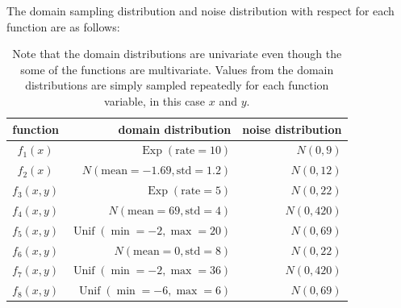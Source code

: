 \documentclass[12pt]{article}
\begin{document}
        The domain sampling distribution and noise distribution with respect for each function are as follows:
        \begin{table}[H]
            \centering
            \caption{Note that the domain distributions are univariate even though the some of the functions are multivariate. Values from the domain distributions are simply sampled repeatedly for each function variable, in this case $x$ and $y$.}
            \begin{tabular}{crr}
                \toprule
                function & domain distribution & noise distribution \\ 
                \midrule
                $f_1(x)$ & $\operatorname{Exp}(\text{rate}=10)$    & $N(0,9)$  \\
                $f_2(x)$ & $N(\text{mean}=-1.69, \text{std}=1.2)$    & $N(0,12)$  \\
                $f_3(x,y)$ & $\operatorname{Exp}(\text{rate}=5)$    & $N(0,22)$  \\
                $f_4(x,y)$ & $N(\text{mean}=69, \text{std}=4)$      & $N(0,420)$ \\
                $f_5(x,y)$ & $\operatorname{Unif}(\min=-2,\max=20)$ & $N(0,69)$  \\ 
                $f_6(x,y)$ & $N(\text{mean}=0, \text{std}=8)$       & $N(0,22)$  \\
                $f_7(x,y)$ & $\operatorname{Unif}(\min=-2,\max=36)$    & $N(0,420)$ \\
                $f_8(x,y)$ & $\operatorname{Unif}(\min=-6,\max=6)$  & $N(0,69)$  \\
                \bottomrule
            \end{tabular}
        \end{table}
\end{document}
